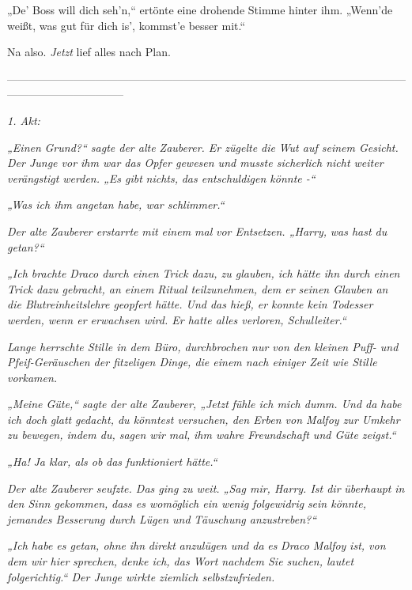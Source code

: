 {„De' Boss will dich seh'n,“ ertönte eine drohende Stimme hinter ihm. „Wenn'de weißt, was gut für dich is', kommst'e besser mit.“

Na also. \emph{Jetzt} lief alles nach Plan.

--------------------------------------------------------------------------------------------------------------------------------------------

\hfill\break \emph{1. Akt:}

\emph{„Einen} \emph{\emph{Grund?}“ sagte der alte Zauberer. Er zügelte die} \emph{Wut auf seinem Gesicht. Der Junge vor ihm war das Opfer gewesen und musste sicherlich nicht weiter verängstigt werden. „Es gibt} \emph{\emph{nichts,}} \emph{das entschuldigen könnte -“}

\emph{„Was ich ihm angetan habe, war schlimmer.“}

\emph{Der alte Zauberer erstarrte} \emph{mit einem mal} \emph{vor Entsetzen. „Harry,} \emph{\emph{was hast du getan?}“}

\emph{„Ich brachte Draco durch einen Trick dazu, zu glauben, ich hätte ihn durch einen Trick dazu gebracht, an einem Ritual teilzunehmen, dem er seinen Glauben an die Blutreinheitslehre geopfert hätte. Und das hieß, er konnte kein Todesser werden, wenn er erwachsen wird. Er hatte alles verloren, Schulleiter.“}

\emph{Lange herrschte Stille in dem Büro, durchbrochen nur von den kleinen Puff- und Pfeif-Geräuschen der fitzeligen Dinge, die einem nach einiger Zeit wie Stille vorkamen.}

\emph{„Meine Güte,“ sagte der alte Zauberer, „\emph{Jetzt}} \emph{fühle ich mich dumm. Und da} \emph{\emph{habe}} \emph{ich doch} \emph{glatt} \emph{gedacht, du könntest versuchen, den Erben von Malfoy zur Umkehr zu bewegen, indem du, sagen wir mal,} \emph{\emph{ihm wahre Freundschaft und Güte zeigst.}“}

\emph{„\emph{Ha!}} \emph{Ja klar, als ob} \emph{\emph{das}} \emph{funktioniert hätte.“}

\emph{Der alte Zauberer seufzte. Das ging zu weit. „Sag mir, Harry. Ist dir} \emph{überhaupt} \emph{\emph{in den Sinn gekommen,}} \emph{dass es womöglich ein wenig} \emph{\emph{folgewidrig}} \emph{sein könnte, jemandes Besserung durch Lügen und} \emph{Täuschung anzustreben?“}

\emph{„Ich habe es getan, ohne} \emph{ihn} \emph{direkt} \emph{anzulügen und da} \emph{es} \emph{Draco Malfoy} \emph{ist, von dem wir hier} \emph{sprechen, denke ich, das Wort nachdem Sie suchen, lautet} \emph{\emph{folgerichtig.}“ Der Junge wirkte ziemlich selbstzufrieden.}

}
